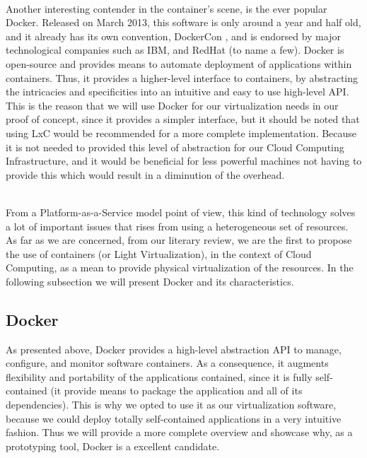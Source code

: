 \documentclass[11pt]{amsart}
\begin{document}
\begin{enumarate}
          \\ Another interesting contender in the container's scene, is the ever popular
          Docker. Released on March 2013, this software is only around a year and half old,
          and it already has its own convention, DockerCon \cite{dockercon}, and is endorsed
          by major technological companies such as IBM, and RedHat (to name a few). Docker
          is open-source and provides means to automate deployment of applications within
          containers. Thus, it provides a higher-level interface to containers, by
          abstracting the intricacies and specificities into an intuitive and easy to use
          high-level API. This is the reason that we will use Docker for our virtualization
          needs in our proof of concept, since it provides a simpler interface, but it
          should be noted that using LxC would be recommended for a more complete
          implementation. Because it is not needed to provided this level of abstraction for
          our Cloud Computing Infrastructure, and it would be beneficial for less powerful
          machines not having to provide this which would result in a diminution of the
          overhead.

          \\ From a Platform-as-a-Service model point of view, this kind of technology
          solves a lot of important issues that rises from using a heterogeneous set of
          resources. As far as we are concerned, from our literary review, we are the first
          to propose the use of containers (or Light Virtualization), in the context of
          Cloud Computing, as a mean to provide physical virtualization of the
          resources. In the following subsection we will present Docker and its
          characteristics.

          \subsection{Docker}
          As presented above, Docker provides a high-level abstraction API to manage,
          configure, and monitor software containers. As a consequence, it augments
          flexibility and portability of the applications contained, since it is fully
          self-contained (it provide means to package the application and all of its
          dependencies). This is why we opted to use it as our virtualization software,
          because we could deploy totally self-contained applications in a very intuitive
          fashion. Thus we will provide a more complete overview and showcase why, as a
          prototyping tool, Docker is a excellent candidate.
          

\end{enumarate}
\end{document}
